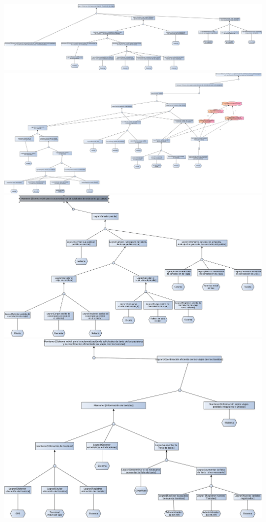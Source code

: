 \documentclass[a4paper]{article}
\begin{document}
\begin{center}
\includegraphics[width=1.3\textwidth,keepaspectratio,angle=90]{diag_objetivos_1.pdf}
\includegraphics[width=1.3\textwidth,keepaspectratio,angle=90]{diag_objetivos_2.pdf}
\includegraphics[width=1.3\textwidth,keepaspectratio,angle=90]{diag_objetivos_3.pdf}
\includegraphics[width=1.3\textwidth,keepaspectratio,angle=90]{diag_objetivos_4.pdf}

\end{center}
\end{document}
